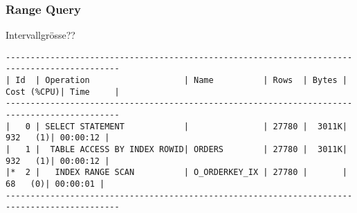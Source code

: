 \documentclass[11pt,a4paper,parskip=half]{scrartcl}
\begin{document}
\subsubsection{Range Query}
Intervallgrösse??
\begin{lstlisting}
---------------------------------------------------------------------------------------------                                                                                                                                                                                                                
| Id  | Operation                   | Name          | Rows  | Bytes | Cost (%CPU)| Time     |                                                                                                                                                                                                                
---------------------------------------------------------------------------------------------                                                                                                                                                                                                                
|   0 | SELECT STATEMENT            |               | 27780 |  3011K|   932   (1)| 00:00:12 |                                                                                                                                                                                                                
|   1 |  TABLE ACCESS BY INDEX ROWID| ORDERS        | 27780 |  3011K|   932   (1)| 00:00:12 |                                                                                                                                                                                                                
|*  2 |   INDEX RANGE SCAN          | O_ORDERKEY_IX | 27780 |       |    68   (0)| 00:00:01 |                                                                                                                                                                                                                
---------------------------------------------------------------------------------------------                                                                                                                                                                                                                
                                                                                                                                                                                                                                                                                                             

\end{lstlisting}
\end{document}
